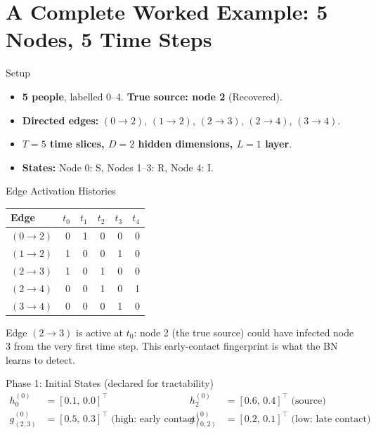 \section{A Complete Worked Example: 5 Nodes, 5 Time Steps}

\begin{conceptbox}{Setup}
\begin{itemize}[noitemsep]
    \item \textbf{5 people}, labelled 0--4. \textbf{True source: node 2} (Recovered).
    \item \textbf{Directed edges:} $(0 \to 2)$, $(1 \to 2)$, $(2 \to 3)$, $(2 \to 4)$, $(3 \to 4)$.
    \item \textbf{$T = 5$ time slices, $D = 2$ hidden dimensions, $L = 1$ layer}.
    \item \textbf{States:} Node 0: S, Nodes 1--3: R, Node 4: I.
\end{itemize}
\end{conceptbox}

\begin{examplebox}{Edge Activation Histories}
\begin{center}
\begin{tabular}{lrrrrr}
\toprule
Edge & $t_0$ & $t_1$ & $t_2$ & $t_3$ & $t_4$ \\
\midrule
$(0 \to 2)$ & 0 & 1 & 0 & 0 & 0 \\
$(1 \to 2)$ & 1 & 0 & 0 & 1 & 0 \\
$(2 \to 3)$ & 1 & 0 & 1 & 0 & 0 \\
$(2 \to 4)$ & 0 & 0 & 1 & 0 & 1 \\
$(3 \to 4)$ & 0 & 0 & 0 & 1 & 0 \\
\bottomrule
\end{tabular}
\end{center}
Edge $(2 \to 3)$ is active at $t_0$: node 2 (the true source) could have infected node 3 from the very first time step. This early-contact fingerprint is what the BN learns to detect.
\end{examplebox}

\begin{examplebox}{Phase 1: Initial States (declared for tractability)}
\begin{align*}
h_0^{(0)}&=[0.1,\,0.0]^\top & h_2^{(0)}&=[0.6,\,0.4]^\top \text{ (source)} \\
g_{(2,3)}^{(0)}&=[0.5,\,0.3]^\top \text{ (high: early contact)} & g_{(0,2)}^{(0)}&=[0.2,\,0.1]^\top \text{ (low: late contact)}
\end{align*}
\end{examplebox}

